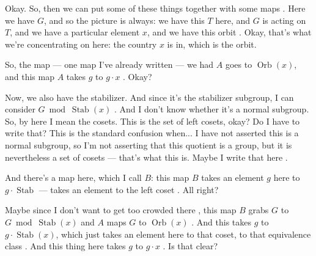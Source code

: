 \begin{speech}[00:22:36 - 00:24:49]
Okay. So, then we can put some of these things together with some maps . Here we have $G$, and so the picture is always: we have this $T$ here, and $G$ is acting on $T$, and we have a particular element $x$, and we have this orbit . Okay, that's what we're concentrating on here: the country $x$ is in, which is the orbit.

So, the map --- one map I've already written --- we had $A$ goes to $\operatorname{Orb}(x)$, and this map $A$ takes $g$ to $g \cdot x$ . Okay?

Now, we also have the stabilizer. And since it's the stabilizer subgroup, I can consider $G \bmod \operatorname{Stab}(x)$ . And I don't know whether it's a normal subgroup. So, by here I mean the cosets. This is the set of left cosets, okay? Do I have to write that? This is the standard confusion when... I have not asserted this is a normal subgroup, so I'm not asserting that this quotient is a group, but it is nevertheless a set of cosets --- that's what this is. Maybe I write that here .

And there's a map here, which I call $B$: this map $B$ takes an element $g$ here to $g \cdot \operatorname{Stab}$ --- takes an element to the left coset . All right?

Maybe since I don't want to get too crowded there , this map $B$ grabs $G$ to $G \bmod \operatorname{Stab}(x)$ and $A$ maps $G$ to $\operatorname{Orb}(x)$ . And this takes $g$ to $g \cdot \operatorname{Stab}(x)$, which just takes an element here to that coset, to that equivalence class . And this thing here takes $g$ to $g \cdot x$ . Is that clear?
\end{speech}

